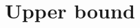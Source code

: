 \newcommand{\counterstart}{s}
\newcommand{\counterrows}{\floor*{\frac{N-4}{12l + 90}}}
\newcommand{\seedheight}{12l + 94}
\newcommand{\rowheight}{12l + 90}

\part{Upper bound}
\label{sec:prelims}






